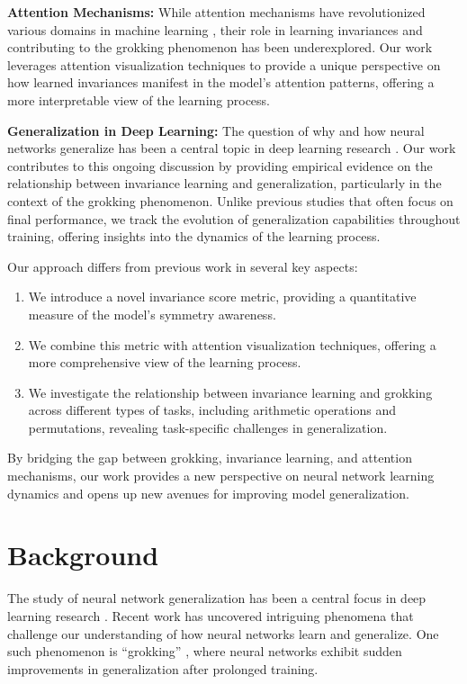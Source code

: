 \documentclass{article} %
\begin{document}
\textbf{Attention Mechanisms:} While attention mechanisms have revolutionized various domains in machine learning \citep{vaswani2017attention}, their role in learning invariances and contributing to the grokking phenomenon has been underexplored. Our work leverages attention visualization techniques to provide a unique perspective on how learned invariances manifest in the model's attention patterns, offering a more interpretable view of the learning process.

\textbf{Generalization in Deep Learning:} The question of why and how neural networks generalize has been a central topic in deep learning research \citep{goodfellow2016deep}. Our work contributes to this ongoing discussion by providing empirical evidence on the relationship between invariance learning and generalization, particularly in the context of the grokking phenomenon. Unlike previous studies that often focus on final performance, we track the evolution of generalization capabilities throughout training, offering insights into the dynamics of the learning process.

Our approach differs from previous work in several key aspects:
\begin{enumerate}
    \item We introduce a novel invariance score metric, providing a quantitative measure of the model's symmetry awareness.
    \item We combine this metric with attention visualization techniques, offering a more comprehensive view of the learning process.
    \item We investigate the relationship between invariance learning and grokking across different types of tasks, including arithmetic operations and permutations, revealing task-specific challenges in generalization.
\end{enumerate}

By bridging the gap between grokking, invariance learning, and attention mechanisms, our work provides a new perspective on neural network learning dynamics and opens up new avenues for improving model generalization.

\section{Background}
\label{sec:background}

The study of neural network generalization has been a central focus in deep learning research \citep{goodfellow2016deep}. Recent work has uncovered intriguing phenomena that challenge our understanding of how neural networks learn and generalize. One such phenomenon is ``grokking'' \citep{power2022grokking}, where neural networks exhibit sudden improvements in generalization after prolonged training.
\end{document}
